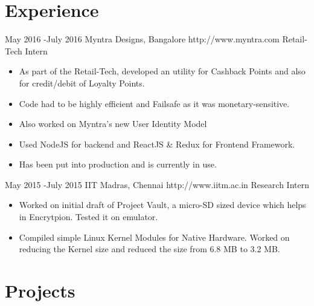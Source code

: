 \documentclass[10pt]{article} %
\begin{document}
\section{Experience}

\job
{May 2016 -}{July 2016}
{Myntra Designs, Bangalore}
{http://www.myntra.com}
{Retail-Tech Intern}

\begin{itemize}
\item {As part of the Retail-Tech, developed an utility for Cashback Points and also for credit/debit of Loyalty Points.}
\item{Code had to be highly efficient and Failsafe as it was monetary-sensitive.}
\item {Also worked on Myntra's new User Identity Model}
\item{Used NodeJS for backend and ReactJS \& Redux for Frontend Framework.}
\item{Has been put into production and is currently in use.}
\end{itemize}

\job
{May 2015 -}{July 2015}
{IIT Madras, Chennai}
{http://www.iitm.ac.in}
{Research Intern}

\begin{itemize}
\item {Worked on initial draft of Project Vault, a micro-SD sized device which helps in Encrytpion. Tested it on emulator.}
\item{Compiled simple Linux Kernel Modules for Native Hardware. Worked on reducing the Kernel size and reduced the size from 6.8 MB to 3.2 MB.}
\end{itemize}


\section{Projects}
\end{document}

